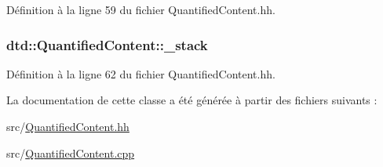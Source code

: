 Définition à la ligne 59 du fichier QuantifiedContent.hh.

\hypertarget{classdtd_1_1_quantified_content_acf63f34405d6c2b4016b442057fc0c56}{
\subsubsection[{\_\-stack}]{ {\bf dtd::QuantifiedContent::\_\-stack}}}
\label{classdtd_1_1_quantified_content_acf63f34405d6c2b4016b442057fc0c56}


Définition à la ligne 62 du fichier QuantifiedContent.hh.



La documentation de cette classe a été générée à partir des fichiers suivants :\begin{DoxyCompactItemize}
\item 
src/\hyperlink{_quantified_content_8hh}{QuantifiedContent.hh}\item 
src/\hyperlink{_quantified_content_8cpp}{QuantifiedContent.cpp}\end{DoxyCompactItemize}
